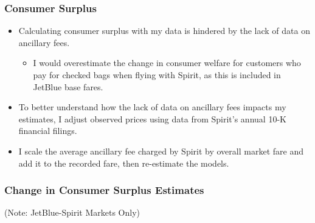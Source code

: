 \documentclass[xcolor=dvipsnames]{beamer}
\begin{document}
    \begin{frame}[label = {Consumer_Surplus}]
        \frametitle{Consumer Surplus}
        \begin{itemize}
            \item Calculating consumer surplus with my data is hindered by the lack of data on ancillary fees.\begin{itemize}
            \item I would overestimate the change in consumer welfare for customers who pay for checked bags when flying with Spirit, as this is included in JetBlue base fares.
            \end{itemize}
            \item To better understand how the lack of data on ancillary fees impacts my estimates, I adjust observed prices using data from Spirit's annual 10-K financial filings.
            \item I scale the average ancillary fee charged by Spirit by overall market fare and add it to the recorded fare, then re-estimate the models.         \hyperlink{Ancillary_Adjust_Methodology}{}

        \end{itemize}
    \end{frame}


    \begin{frame}
        \frametitle{Change in Consumer Surplus Estimates}
        \tiny
        \centering
{}

    (Note: JetBlue-Spirit Markets Only)
    \end{frame}
\end{document}
